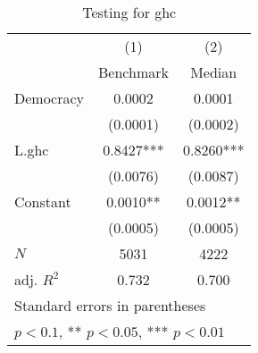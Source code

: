 \begin{table}[htbp]\centering
\def\sym#1{\ifmmode^{#1}\else\(^{#1}\)\fi}
\caption{Testing for ghc \label{tab:regression7}}
\begin{tabular}{l*{2}{c}}
\hline\hline
            &\multicolumn{1}{c}{(1)}&\multicolumn{1}{c}{(2)}\\
            &\multicolumn{1}{c}{Benchmark}&\multicolumn{1}{c}{Median}\\
\hline
Democracy   &      0.0002   &      0.0001   \\
            &    (0.0001)   &    (0.0002)   \\
[1em]
L.ghc       &      0.8427***&      0.8260***\\
            &    (0.0076)   &    (0.0087)   \\
[1em]
Constant    &      0.0010** &      0.0012** \\
            &    (0.0005)   &    (0.0005)   \\
\hline
\(N\)       &        5031   &        4222   \\
adj. \(R^{2}\)&       0.732   &       0.700   \\
\hline\hline
\multicolumn{3}{l}{\footnotesize Standard errors in parentheses}\\
\multicolumn{3}{l}{\footnotesize * \(p<0.1\), ** \(p<0.05\), *** \(p<0.01\)}\\
\end{tabular}
\end{table}
